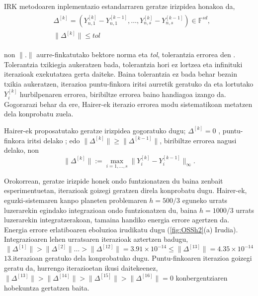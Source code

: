 IRK metodoaren inplementazio estandarraren geratze irizpidea honakoa da,
\begin{align}
\begin{split}
&\Delta^{[k]}=(Y_{n,1}^{[k]}-Y_{n,1}^{[k-1]},\dots,Y_{n,s}^{[k]}-Y_{n,s}^{[k-1]}) \in \mathbb{F}^{sd},\\
&\|\Delta^{[k]}\| \leqslant tol
\end{split}
\end{align} 

non $\|.\|$ aurre-finkatutako bektore norma eta \emph{tol}, tolerantzia errorea den . Tolerantzia txikiegia aukeratzen bada, tolerantzia hori ez lortzea eta infinituki iterazioak exekutatzea gerta daiteke. Baina tolerantzia ez bada behar bezain txikia aukeratzen, iterazioa puntu-finkora iritsi aurretik geratuko da eta lortutako $Y_i^{[k]}$ hurbilpenaren errorea, biribiltze errorea baino  handiagoa izango da. Gogorarazi behar da ere, Hairer-ek \cite{Hairer2008} iterazio errorea modu sistematikoan metatzen dela konprobatu zuela.   

Hairer-ek proposatutako geratze irizpidea gogoratuko dugu; $\Delta^{[k]} = 0$ , puntu-finkora iritsi delako ;  edo   $\|\Delta^{[k]}\| \geqslant \|\Delta^{[k-1]}\|$, biribiltze errorea nagusi delako,
non
\begin{equation*}
\|\Delta^{[k]}\|:= \max_{i=1,\dots,s} \|Y_i^{[k]}-Y_i^{[k-1]}\|_{\infty}.
\end{equation*}


Orokorrean, geratze irizpide honek ondo funtzionatzen du baina zenbait esperimentuetan, iterazioak goizegi geratzen direla konprobatu dugu. Hairer-ek, eguzki-sistemaren kanpo planeten problemaren $h=500/3$ eguneko urrats luzerarekin egindako integrazioan ondo funtzionatzen du, baina $h=1000/3$ urrats luzerarekin integratzerakoan, tamaina handiko energia errore agertzen da. Energia errore erlatiboaren eboluzioa irudikatu dugu (\ref{fig:OSSh2}(a) Irudia). Integrazioaren lehen urratsaren iterazioak aztertzen badugu,
\begin{equation*}
\|\Delta^{[1]}\|>\|\Delta^{[2]}\| \dots > \|\Delta^{[12]}\|=3.91\times 10^{-14} \leqslant \|\Delta^{[13]}\|=4.35 \times 10^{-14} 
\end{equation*} 
$13.$iterazioan geratuko dela konprobatuko dugu. Puntu-finkoaren iterazioa goizegi geratu da, hurrengo iterazioetan ikusi daitekeenez, $\|\Delta^{[13]}\|>\|\Delta^{[14]}\|>\|\Delta^{[15]}\|>\|\Delta^{[16]}\|=0$ konbergentziaren hobekuntza gertatzen baita. 

